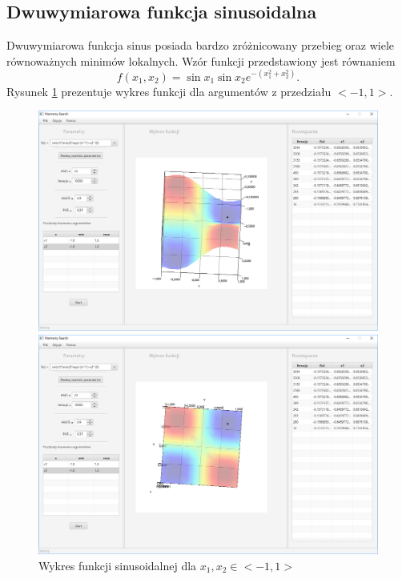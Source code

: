 \documentclass[10pt, a4paper]{article}
\begin{document}
\subsection{Dwuwymiarowa funkcja sinusoidalna}
\label{subsec:sin}
Dwuwymiarowa funkcja sinus posiada bardzo zróżnicowany przebieg oraz wiele równoważnych minimów lokalnych. Wzór funkcji przedstawiony jest równaniem $$f(x_{1},x_{2})=\sin{x_{1}}\sin{x_{2}}e^{-(x_{1}^2+x_{2}^2)}.$$ Rysunek \ref{fig:8} prezentuje wykres funkcji dla argumentów z przedziału $<-1,1>$.
\begin{figure}[htbp] 
	\begin{minipage}[b]{1\textwidth}
		\centering
		\includegraphics[width=\linewidth]{images/81.PNG}
	\end{minipage} 
	\begin{minipage}[b]{1\textwidth}
		\centering
		\includegraphics[width=\linewidth]{images/82.PNG} 
	\end{minipage}
	\label{fig:8}
	\caption{Wykres funkcji sinusoidalnej dla $x_{1}, x_{2} \in <-1,1>$}
\end{figure}
\end{document}

